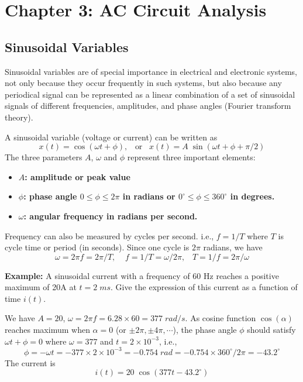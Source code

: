 \usepackage{html}
\textwidth 6.0in
\topmargin -0.5in
\oddsidemargin -0in
\evensidemargin -0.5in


\section*{Chapter 3: AC Circuit Analysis}

\subsection*{Sinusoidal Variables}

Sinusoidal variables are of special importance in electrical and 
electronic systems, not only because they occur frequently in such 
systems, but also because any periodical signal can be represented 
as a linear combination of a set of sinusoidal signals of different 
frequencies, amplitudes, and phase angles (Fourier transform theory).

A sinusoidal variable (voltage or current) can be written as
\[	x(t)=\cos(\omega t + \phi),\;\;\;\mbox{or}\;\;\;
	x(t)=A\;\sin(\omega t+\phi+\pi/2) \]
The three parameters $A$, $\omega$ and $\phi$ represent three 
important elements:
\begin{itemize}
\item {\bf $A$: amplitude or peak value}
\item {\bf $\phi$: phase angle $0 \le \phi \le 2\pi$ in radians or
	$0^\circ \le \phi \le 360^\circ$ in degrees.}
\item {\bf $\omega$: angular frequency in radians per second.}
\end{itemize}
Frequency can also be measured by cycles per second. i.e., $f=1/T$ 
where $T$ is cycle time or period (in seconds). Since one cycle is
$2\pi$ radians, we have 
\[ \omega=2\pi f=2\pi/T,\;\;\;\;f=1/T=\omega/2\pi,\;\;\;T=1/f=2\pi/\omega \]

{\bf Example:} A sinusoidal current with a frequency of 60 Hz reaches
a positive maximum of 20A at $t=2 \; ms$. Give the expression of this
current as a function of time $i(t)$.

We have $A=20$, $\omega=2\pi f=6.28\times 60=377\;rad/s$. As cosine
function $\cos(\alpha)$ reaches maximum when $\alpha=0$ (or $\pm 2\pi,
\pm 4\pi, \cdots$), the phase angle $\phi$ should satisfy 
$\omega t+\phi=0$ where $\omega=377$ and $t=2\times 10^{-3}$, i.e.,
\[	\phi=-\omega t=-377 \times 2 \times 10^{-3}=-0.754\; rad 
	=-0.754\times 360^\circ /2\pi=-43.2^\circ	\]
The current is
\[	i(t)=20\;\cos(377 t-43.2^\circ)	\]

